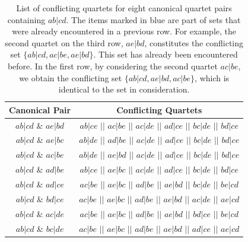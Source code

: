 \begin{table}[h]
    \centering
     \renewcommand{\arraystretch}{1.2}
    \begin{tabular}{|c|c|}
        \hline
        \textbf{Canonical Pair} & \textbf{Conflicting Quartets} \\ \hline
        
        $ab|cd$ \& $ae|bd$ 
        & $ab|ce$ $||$ $ac|be$ $||$ $ac|de$ $||$ $ad|ce$ $||$ $bc|de$ $||$ $bd|ce$\\ \hline
        
        $ab|cd$ \& $ae|bc$ 
        & $ab|de$ $||$ $ad|be$ $||$ $ac|de$ $||$ $ad|ce$ $||$ $bc|de$ $||$ $bd|ce$\\ \hline

        $ab|cd$ \& $ac|be$ 
        & $ab|de$ $||$ \textcolor{\rc}{$ae|bd$} $||$ $ac|de$ $||$ $ad|ce$ $||$ $bc|de$ $||$ $bd|ce$\\ \hline

        $ab|cd$ \& $ad|be$ 
        & $ab|ce$ $||$ \textcolor{\rc}{$ae|bc$} $||$ $ac|de$ $||$ $ad|ce$ $||$ $bc|de$ $||$ $bd|ce$\\ \hline

        $ab|cd$ \& $ad|ce$ 
        & \textcolor{\rc}{$ac|be$} $||$ \textcolor{\rc}{$ae|bc$} $||$ \textcolor{\rc}{$ad|be$} $||$ \textcolor{\rc}{$ae|bd$} $||$ $bc|de$ $||$ $be|cd$\\ \hline

        $ab|cd$ \& $bd|ce$ 
        & \textcolor{\rc}{$ac|be$} $||$ \textcolor{\rc}{$ae|bc$} $||$ \textcolor{\rc}{$ad|be$} $||$ \textcolor{\rc}{$ae|bd$} $||$ $ac|de$ $||$ $ae|cd$\\ \hline

        $ab|cd$ \& $ac|de$ 
        & \textcolor{\rc}{$ac|be$} $||$ \textcolor{\rc}{$ae|bc$} $||$ \textcolor{\rc}{$ad|be$} $||$ \textcolor{\rc}{$ae|bd$} $||$ \textcolor{\rc}{$bd|ce$} $||$ $be|cd$\\ \hline

        $ab|cd$ \& $bc|de$ 
        & \textcolor{\rc}{$ac|be$} $||$ \textcolor{\rc}{$ae|bc$} $||$ \textcolor{\rc}{$ad|be$} $||$ \textcolor{\rc}{$ae|bd$} $||$ \textcolor{\rc}{$ad|ce$} $||$ $ae|cd$\\ \hline
        
    \end{tabular}
    \caption{List of conflicting quartets for eight canonical quartet pairs containing $ab|cd$. The items marked in blue are part of sets that were already encountered in a previous row. For example, the second quartet on the third row, $ae|bd$, constitutes the conflicting set $\{ab|cd, ac|be, ae|bd\}$. This set has already been encountered before. In the first row, by considering the second quartet $ac|be$, we obtain the conflicting set $\{ab|cd, ae|bd, ac|be\}$, which is identical to the set in consideration.}
    \label{table:conflicttable}
\end{table}